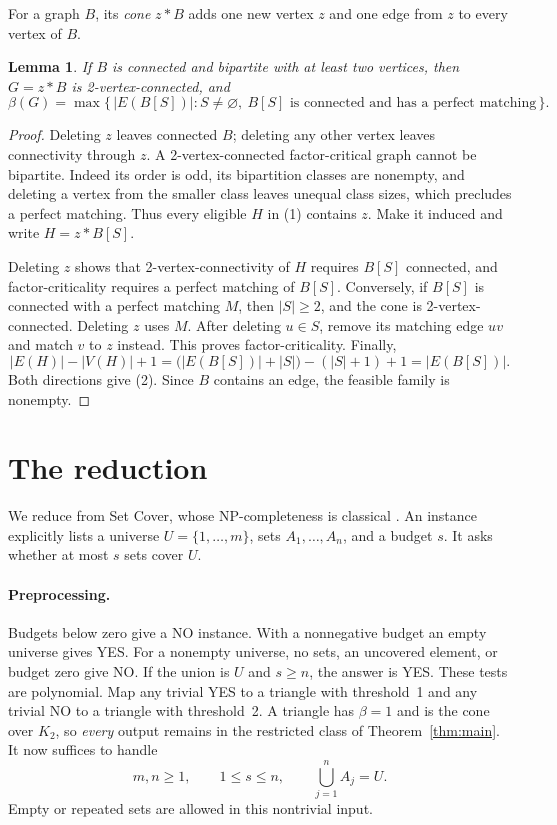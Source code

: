 \documentclass[11pt]{article}
\newtheorem{lemma}[theorem]{Lemma}
\newcommand{\cone}{\mathbin{*}}
\begin{document}
For a graph \(B\), its \emph{cone} \(z\cone B\) adds one new vertex \(z\)
and one edge from \(z\) to every vertex of \(B\).
\begin{lemma}\label{lem:cone}
If \(B\) is connected and bipartite with at least two vertices, then
\(G=z\cone B\) is 2-vertex-connected, and
\[
 \beta(G)=\max\{\,|E(B[S])|:
   S\ne\varnothing,\ B[S]\text{ is connected and has a perfect matching}\,\}.
 \tag{2}\label{eq:cone}
\]
\end{lemma}
\begin{proof}
Deleting \(z\) leaves connected \(B\); deleting any other vertex leaves
connectivity through \(z\). A 2-vertex-connected factor-critical graph
cannot be bipartite. Indeed its order is odd, its bipartition classes
are nonempty, and deleting a vertex from the smaller class leaves
unequal class sizes, which precludes a perfect matching. Thus every
eligible \(H\) in (1) contains \(z\). Make it induced and write
\(H=z\cone B[S]\).

Deleting \(z\) shows that 2-vertex-connectivity of \(H\) requires
\(B[S]\) connected, and factor-criticality requires a perfect matching
of \(B[S]\). Conversely, if \(B[S]\) is connected with a perfect matching
\(M\), then \(|S|\ge2\), and the cone is 2-vertex-connected. Deleting \(z\)
uses \(M\). After deleting \(u\in S\), remove its matching edge \(uv\)
and match \(v\) to \(z\) instead. This proves factor-criticality.
Finally,
\[
 |E(H)|-|V(H)|+1
 =\bigl(|E(B[S])|+|S|\bigr)-(|S|+1)+1=|E(B[S])|.
\]
Both directions give (2). Since \(B\) contains an edge, the feasible
family is nonempty.
\end{proof}

\section{The reduction}
We reduce from Set Cover, whose NP-completeness is classical
\cite{Karp}. An instance explicitly lists a universe
\(U=\{1,\ldots,m\}\), sets \(A_1,\ldots,A_n\), and a budget \(s\).
It asks whether at most \(s\) sets cover \(U\).

\paragraph{Preprocessing.}
Budgets below zero give a NO instance. With a nonnegative budget an
empty universe gives YES. For a nonempty universe, no sets, an uncovered
element, or budget zero give NO. If the union is \(U\) and \(s\ge n\),
the answer is YES. These tests are polynomial. Map any trivial YES to
a triangle with threshold~1 and any trivial NO to a triangle with
threshold~2. A triangle has \(\beta=1\) and is the cone over \(K_2\), so
\emph{every} output remains in the restricted class of
Theorem~\ref{thm:main}. It now suffices to handle
\[
 m,n\ge1,\qquad 1\le s\le n,\qquad \bigcup_{j=1}^n A_j=U.
\]
Empty or repeated sets are allowed in this nontrivial input.
\end{document}
